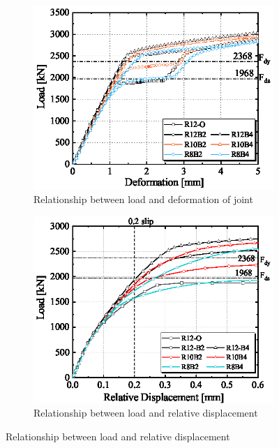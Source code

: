 \begin{figure}[htbp]
    \begin{subfigure}[t]{0.49\textwidth}
        \centering
        \includegraphics[width=\linewidth]{imgs/ch5/LD-A.eps}
        \caption{Relationship between load and deformation of joint}
        \label{fig-loadD}
    \end{subfigure}
    \begin{subfigure}[t]{0.49\textwidth}
        \centering
        \includegraphics[width=\linewidth]{imgs/ch5/load-rd.eps}
        \caption{Relationship between load and relative displacement}
        \label{fig-loadrd}
    \end{subfigure}
\end{figure}


